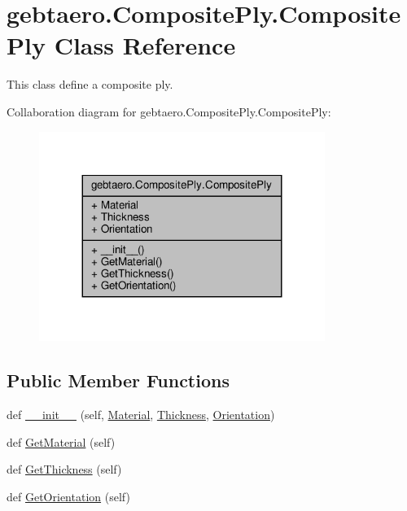 \hypertarget{classgebtaero_1_1_composite_ply_1_1_composite_ply}{}\section{gebtaero.\+Composite\+Ply.\+Composite\+Ply Class Reference}
\label{classgebtaero_1_1_composite_ply_1_1_composite_ply}


This class define a composite ply.  




Collaboration diagram for gebtaero.\+Composite\+Ply.\+Composite\+Ply\+:\nopagebreak
\begin{figure}[H]
\begin{center}
\leavevmode
\includegraphics[width=263pt]{classgebtaero_1_1_composite_ply_1_1_composite_ply__coll__graph}
\end{center}
\end{figure}
\subsection*{Public Member Functions}
\begin{DoxyCompactItemize}
\item 
def \hyperlink{classgebtaero_1_1_composite_ply_1_1_composite_ply_a1165011eca12a4b958aee5cfda595258}{\+\_\+\+\_\+init\+\_\+\+\_\+} (self, \hyperlink{classgebtaero_1_1_composite_ply_1_1_composite_ply_a5ec1ca6af4be2e10bab777f29f469e3e}{Material}, \hyperlink{classgebtaero_1_1_composite_ply_1_1_composite_ply_a0356871876ebf481a0d252f6db1171da}{Thickness}, \hyperlink{classgebtaero_1_1_composite_ply_1_1_composite_ply_a17a90c6f267e88387ac5c06a3dad1cc7}{Orientation})
\item 
def \hyperlink{classgebtaero_1_1_composite_ply_1_1_composite_ply_ae6cc2be5f3b6f81d239215f92db1e410}{Get\+Material} (self)
\item 
def \hyperlink{classgebtaero_1_1_composite_ply_1_1_composite_ply_a87b7989f6e41a5c97d6401d429002731}{Get\+Thickness} (self)
\item 
def \hyperlink{classgebtaero_1_1_composite_ply_1_1_composite_ply_ae60dbb9255f4aac7c6b455ea0f4ea282}{Get\+Orientation} (self)
\end{DoxyCompactItemize}
